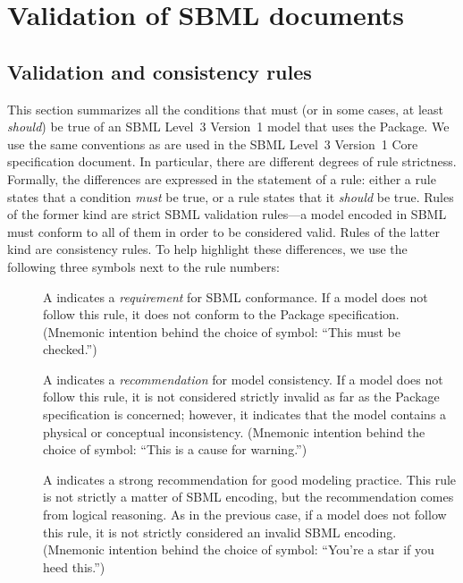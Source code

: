 
\section{Validation of SBML documents}
\label{apdx-validation}

\subsection{Validation and consistency rules}
\label{validation-rules}

This section summarizes all the conditions that must (or in some cases,
at least \emph{should}) be true of an SBML Level~3 Version~1 model that
uses the \FBC Package. We use the same conventions as
are used in the SBML Level~3 Version~1 Core specification document. In
particular, there are different degrees of rule strictness. Formally,
the differences are expressed in the statement of a rule: either a rule
states that a condition \emph{must} be true, or a rule states that it
\emph{should} be true. Rules of the former kind are strict SBML
validation rules---a model encoded in SBML must conform to all of them
in order to be considered valid. Rules of the latter kind are
consistency rules. To help highlight these differences, we use the
following three symbols next to the rule numbers:

\begin{description}

\item[\hspace*{6.5pt}\vSymbol\vsp] A \vSymbolName indicates a
\emph{requirement} for SBML conformance. If a model does not follow this
rule, it does not conform to the \FBC Package
specification. (Mnemonic intention behind the choice of symbol: ``This
must be checked.'')

\item[\hspace*{6.5pt}\cSymbol\csp] A \cSymbolName indicates a
\emph{recommendation} for model consistency. If a model does not follow
this rule, it is not considered strictly invalid as far as the
\FBC Package specification is concerned; however, it
indicates that the model contains a physical or conceptual
inconsistency. (Mnemonic intention behind the choice of symbol: ``This
is a cause for warning.'')

\item[\hspace*{6.5pt}\mSymbol\msp] A \mSymbolName indicates a strong
recommendation for good modeling practice. This rule is not strictly a
matter of SBML encoding, but the recommendation comes from logical
reasoning. As in the previous case, if a model does not follow this
rule, it is not strictly considered an invalid SBML encoding. (Mnemonic
intention behind the choice of symbol: ``You're a star if you heed
this.'')

\end{description}

